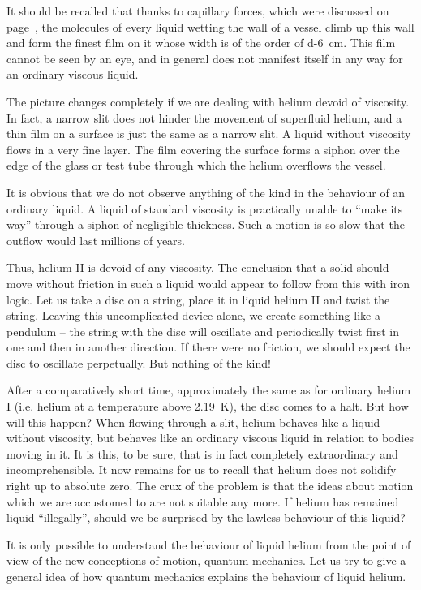 It should be recalled that thanks to capillary forces, which were discussed on page~\pageref{capillary-force}, the molecules of every liquid wetting the wall of a vessel climb up this wall and form the finest film on it whose width is of the order of \SI{d-6}{\centi\meter}. This film cannot be seen by an eye, and in gener­al does not manifest itself in any way for an ordinary viscous liquid.

The picture changes completely if we are dealing with helium devoid of viscosity. In fact, a narrow slit does not hinder the movement of superfluid helium, and a thin film on a surface is just the same as a narrow slit. A liquid without viscosity flows in a very fine layer. The film cov­ering the surface forms a siphon over the edge of the glass or test tube through which the helium overflows the vessel.

It is obvious that we do not observe anything of the kind in the behaviour of an ordinary liquid. A liquid of standard viscosity is practically unable to ``make its way'' through a siphon of negligible thickness. Such a motion is so slow that the outflow would last millions of years.

Thus, helium II is devoid of any viscosity. The conclu­sion that a solid should move without friction in such a liquid would appear to follow from this with iron logic. Let us take a disc on a string, place it in liquid helium II and twist the string. Leaving this uncomplicated device alone, we create something like a pendulum -- the string with the disc will oscillate and periodically twist first in one and then in another direction. If there were no friction, we should expect the disc to oscillate perpet­ually. But nothing of the kind! 

After a comparatively short time, approximately the same as for ordinary helium I (i.e. helium at a temperature above \SI{2.19}{\kelvin}), the disc comes to a halt. But how will this happen? When flowing through a slit, helium behaves like a liquid without vis­cosity, but behaves like an ordinary viscous liquid in relation to bodies moving in it. It is this, to be sure, that is in fact completely extraordinary and incomprehensible. It now remains for us to recall that helium does not solidify right up to absolute zero. The crux of the problem is that the ideas about motion which we are accustomed to are not suitable any more. If helium has remained liquid ``illegally'', should we be surprised by the lawless behaviour of this liquid?

It is only possible to understand the behaviour of liquid helium from the point of view of the new concep­tions of motion, quantum mechanics. Let us try to give a general idea of how quantum mechanics explains the behaviour of liquid helium.

